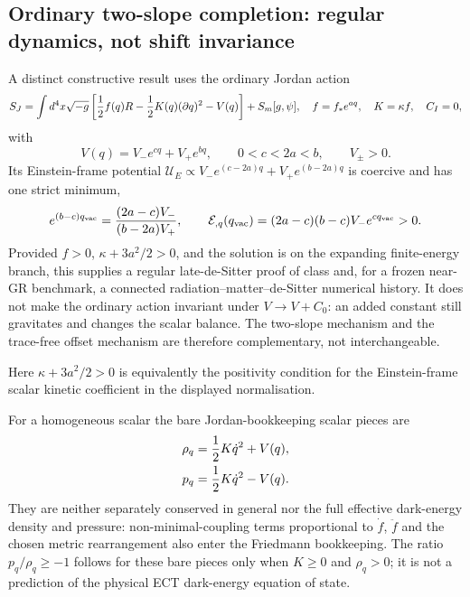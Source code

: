 \subsection{Ordinary two-slope completion: regular dynamics, not shift
invariance}
\label{subsec:frw_cc}

A distinct constructive result uses the ordinary Jordan action
\begin{equation}
 S_J=\int d^4x\sqrt{-g}\left[
 {1\over2}f(q)R-{1\over2}K(q)(\partial q)^2-V(q)\right]+S_m[g,\psi],
 \quad
 f=f_*e^{aq},\quad K=\kappa f,\quad C_I=0,
 \label{eq:frw_lagrangian_cc}
\end{equation}
with
\begin{equation}
 V(q)=V_-e^{cq}+V_+e^{bq},\qquad
 0<c<2a<b,\qquad V_\pm>0.
 \label{eq:cc_two_slope_action}
\end{equation}
Its Einstein-frame potential
$\mathcal U_E\propto V_-e^{(c-2a)q}+V_+e^{(b-2a)q}$ is coercive and
has one strict minimum,
\begin{equation}
 e^{(b-c)q_{\rm vac}}
 ={(2a-c)V_-\over(b-2a)V_+},\qquad
 \mathcal E_{,q}(q_{\rm vac})
 =(2a-c)(b-c)V_-e^{cq_{\rm vac}}>0.
 \label{eq:cc_two_slope_root}
\end{equation}
Provided $f>0$, $\kappa+3a^2/2>0$, and the solution is on the expanding
finite-energy branch, this supplies a
regular late-de-Sitter proof of class and, for a frozen
near-GR benchmark, a connected radiation--matter--de-Sitter numerical
history.  It does not make the ordinary action invariant under
$V\to V+C_0$: an added constant still gravitates and changes the scalar
balance.  The two-slope mechanism and the trace-free offset mechanism are
therefore complementary, not interchangeable.

Here $\kappa+3a^2/2>0$ is equivalently the positivity condition for the
Einstein-frame scalar kinetic coefficient in the displayed normalisation.

For a homogeneous scalar the bare Jordan-bookkeeping scalar pieces are
\begin{align}
 \rho_q&={1\over2}K\dot q^2+V(q),
 \label{eq:rho_q_cc}\\
 p_q&={1\over2}K\dot q^2-V(q).
 \label{eq:p_q_cc}
\end{align}
They are neither separately conserved in general nor the full effective
dark-energy density and pressure: non-minimal-coupling terms proportional to
$\dot f$, $\ddot f$ and the chosen metric rearrangement also enter the
Friedmann bookkeeping.  The ratio $p_q/\rho_q\ge-1$ follows for these bare
pieces only when $K\ge0$ and $\rho_q>0$; it is not a prediction of the
physical ECT dark-energy equation of state.

